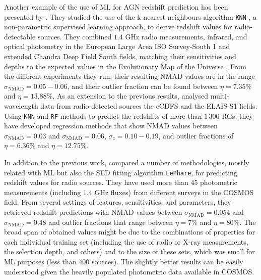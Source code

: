 \documentclass{aa}
\begin{document}
Another example of the use of ML for AGN redshift prediction has been presented by \citet{2019PASP..131j8003L}. They studied the use of the k-nearest neighbours algorithm \verb|KNN| \citep{1053964}, a non-parametric supervised learning approach, to derive redshift values for radio-detectable sources. They combined $1.4$ GHz radio measurements, infrared, and optical photometry in the European Large Area ISO Survey-South 1 \citep[ELAIS-S1;][]{2000MNRAS.316..749O} and extended Chandra Deep Field South \citep[eCDFS;][]{2005ApJS..161...21L} fields, matching their sensitivities and depths to the expected values in the Evolutionary Map of the Universe \citep[EMU;][]{2011PASA...28..215N}. From the different experiments they run, their resulting NMAD values are in the range ${\sigma_{\mathrm{NMAD}} = 0.05 - 0.06}$, and their outlier fraction can be found between ${\eta = 7.35 \%}$ and ${\eta = 13.88 \%}$. 
As an extension to the previous results, \citet{LUKEN2022100557} analysed multi-wavelength data from radio-detected sources the eCDFS and the ELAIS-S1 fields. Using \texttt{KNN} and \texttt{RF} methods to predict the redshifts of more than $1\,300$ RGs, they have developed regression methods that show NMAD values between ${\sigma_{\mathrm{NMAD}} = 0.03}$ and ${\sigma_{\mathrm{NMAD}} = 0.06}$, ${\sigma_{z} = 0.10 - 0.19}$, and outlier fractions of ${\eta = 6.36 \%}$ and ${\eta = 12.75 \%}$.

In addition to the previous work, \citet{2019PASP..131j8004N} compared a number of methodologies, mostly related with ML but also the SED fitting algorithm \texttt{LePhare}, for predicting redshift values for radio sources. They have used more than $45$ photometric measurements (including $1.4$ GHz fluxes) from different surveys in the COSMOS field. From several settings of features, sensitivities, and parameters, they retrieved redshift predictions with NMAD values between ${\sigma_{\mathrm{NMAD}} = 0.054}$ and ${\sigma_{\mathrm{NMAD}} = 0.48}$ and outlier fractions that range between ${\eta = 7 \%}$ and ${\eta = 80 \%}$. The broad span of obtained values might be due to the combinations of properties for each individual training set (including the use of radio or X-ray measurements, the selection depth, and others) and to the size of these sets, which was small for ML purposes (less than $400$ sources). The slightly better results can be easily understood given the heavily populated photometric data available in COSMOS.
\end{document}
